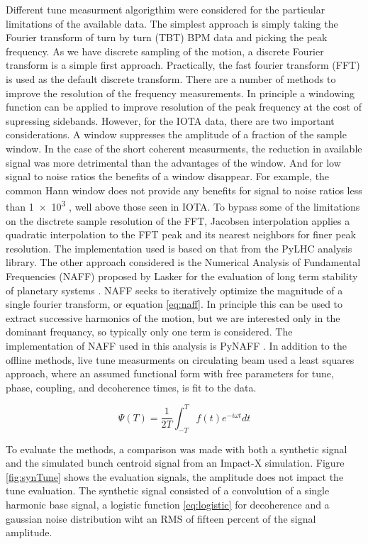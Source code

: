 Different tune measurment algorigthim were considered for the particular limitations of the available data. The simplest approach is simply taking the Fourier transform of turn by turn (TBT) BPM data and picking the peak frequency. As we have discrete sampling of the motion, a discrete Fourier transform is a simple first approach. Practically, the fast fourier transform (FFT) is used as the default discrete transform. There are a number of methods to improve the resolution of the frequency measurements. In principle a windowing function can be applied to improve resolution of the peak frequency at the cost of supressing sidebands. However, for the IOTA data, there are two important considerations. A window suppresses the amplitude of a fraction of the sample window. In the case of the short coherent measurments, the reduction in available signal was more detrimental than the advantages of the window. And for low signal to noise ratios the benefits of a window disappear. For example, the common Hann window does not provide any benefits for signal to noise ratios less than \num{1e3} \cite{bartoliniAlgorithms}, well above those seen in IOTA. To bypass some of the limitations on the disctrete sample resolution of the FFT, Jacobsen interpolation \cite{jacobesnLocla} applies a quadratic interpolation to the FFT peak and its nearest neighbors for finer peak resolution. The implementation used is based on that from the PyLHC \cite{cernomc} analysis library. The other approach considered is the Numerical Analysis of Fundamental Frequencies (NAFF) proposed by Lasker for the evaluation of long term stability of planetary systems \cite{laskar}. NAFF seeks to iteratively optimize the magnitude of a single fourier transform, or equation \ref{eq:naff}. In principle this can be used to extract successive harmonics of the motion, but we are interested only in the dominant frequancy, so typically only one term is considered. The implementation of NAFF used in this analysis is PyNAFF \cite{zisopolusPyZ}. In addition to the offline methods, live tune measurments on circulating beam used a least squares approach, where an assumed functional form with free parameters for tune, phase, coupling, and decoherence times, is fit to the data.

\begin{equation}
	\Psi(T) = \frac{1}{2T}\int_{-T}^{T}f(t)e^{-i\omega t}dt
	\label{eq:naff}
\end{equation}

To evaluate the methods, a comparison was made with both a synthetic signal and the simulated bunch centroid signal from an Impact-X simulation. Figure \ref{fig:synTune} shows the evaluation signals, the amplitude does not impact the tune evaluation. The synthetic signal consisted of a convolution of a single harmonic base signal, a logistic function \ref{eq:logistic} for decoherence and a gaussian noise distribution wiht an RMS of fifteen percent of the signal amplitude. 

